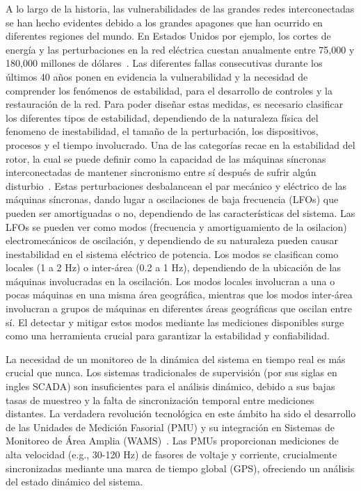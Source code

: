 A lo largo de la historia, las vulnerabilidades de las grandes redes interconectadas se han hecho evidentes debido a los grandes apagones que han ocurrido en diferentes regiones del mundo. En Estados Unidos por ejemplo, los cortes de energía y las perturbaciones en la red eléctrica cuestan anualmente entre 75,000 y 180,000 millones de dólares~\cite{Amin2008}. Las diferentes fallas consecutivas durante los últimos 40 años ponen en evidencia la vulnerabilidad y la necesidad de comprender los fenómenos de estabilidad, para el desarrollo de controles y la restauración de la red. Para poder diseñar estas medidas, es necesario clasificar los diferentes tipos de estabilidad, dependiendo de la naturaleza física del fenomeno de inestabilidad, el tamaño de la perturbación, los dispositivos, procesos y el tiempo involucrado. Una de las categorías recae en la estabilidad del rotor, la cual se puede definir como la capacidad de las máquinas síncronas interconectadas de mantener sincronismo entre sí después de sufrir algún disturbio~\cite{Kundur2004, Hatziargyriou2021}. Estas perturbaciones desbalancean el par mecánico y eléctrico de las máquinas síncronas, dando lugar a oscilaciones de baja frecuencia (LFOs) que pueden ser amortiguadas o no, dependiendo de las características del sistema. Las LFOs se pueden ver como modos (frecuencia y amortiguamiento de la osilacion) electromecánicos de oscilación, y dependiendo de su naturaleza pueden causar inestabilidad en el sistema eléctrico de potencia. Los modos se clasifican como locales (1 a 2 Hz) o inter-área (0.2 a 1 Hz), dependiendo de la ubicación de las máquinas involucradas en la oscilación. Los modos locales involucran a una o pocas máquinas en una misma área geográfica, mientras que los modos inter-área involucran a grupos de máquinas en diferentes áreas geográficas que oscilan entre sí. El detectar y mitigar estos modos mediante las mediciones disponibles surge como una herramienta crucial para garantizar la estabilidad y confiabilidad. 

La necesidad de un monitoreo de la dinámica del sistema en tiempo real es más crucial que nunca. Los sistemas tradicionales de supervisión (por sus siglas en ingles SCADA) son insuficientes para el análisis dinámico, debido a sus bajas tasas de muestreo y la falta de sincronización temporal entre mediciones distantes. La verdadera revolución tecnológica en este ámbito ha sido el desarrollo de las Unidades de Medición Fasorial (PMU) y su integración en Sistemas de Monitoreo de Área Amplia (WAMS)~\cite{Hauer2007}. Las PMUs proporcionan mediciones de alta velocidad (e.g., 30-120 Hz) de fasores de voltaje y corriente, crucialmente sincronizadas mediante una marca de tiempo global (GPS), ofreciendo un análisis del estado dinámico del sistema.

